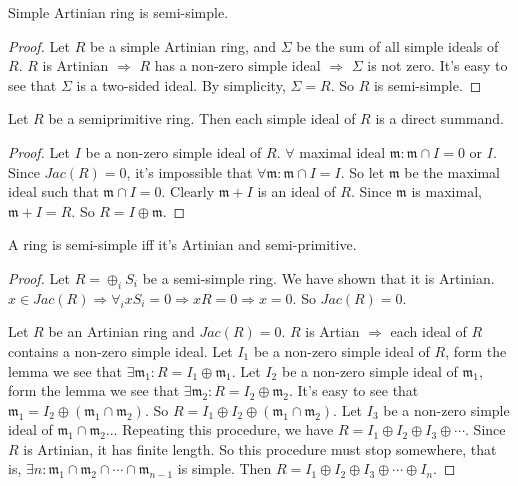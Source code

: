 \documentclass[12pt]{book}
\begin{document}
	\begin{theorem}
		Simple Artinian ring is semi-simple.
	\end{theorem}
	\begin{proof}
		Let $R$ be a simple Artinian ring, and $\Sigma$ be the sum of all simple ideals of $R$.  $R$ is Artinian $\Rightarrow$ $R$ has a non-zero simple ideal $\Rightarrow$ $\Sigma$ is not zero. It's easy to see that $\Sigma$ is a two-sided ideal. By simplicity, $\Sigma=R$. So $R$ is semi-simple.
	\end{proof}
	
	\begin{lemma}
		Let $R$ be a semiprimitive ring. Then each simple ideal of $R$ is a direct summand.
	\end{lemma}
	\begin{proof}
		Let $I$ be a non-zero simple ideal of $R$. $\forall$ maximal ideal $\mathfrak m: \mathfrak m\cap I=0$ or $I$. Since $Jac(R)=0$, it's impossible that $\forall\mathfrak m: \mathfrak m\cap I=I$. So let $\mathfrak m$ be the maximal ideal such that $\mathfrak m\cap I=0$. Clearly $\mathfrak m+ I$ is an ideal of $R$. Since $\mathfrak m$ is maximal, $\mathfrak m+ I=R$. So $R=I\oplus \mathfrak m$.	
	\end{proof}
	
	\begin{theorem}
		A ring is semi-simple iff it's Artinian and semi-primitive.
	\end{theorem}
	\begin{proof}
		Let $R=\oplus_i S_i$ be a semi-simple ring. We have shown that it is Artinian. $x\in Jac(R)\Rightarrow \forall_i xS_i=0\Rightarrow xR=0\Rightarrow x=0$. So $Jac(R)=0$.
		
		Let $R$ be an Artinian ring and $Jac(R)=0$. $R$ is Artian $\Rightarrow$ each ideal of $R$ contains a non-zero simple ideal. Let $I_1$ be a non-zero simple ideal of $R$, form the lemma we see that $\exists \mathfrak m_1: R=I_1\oplus \mathfrak m_1$. Let $I_2$ be a non-zero simple ideal of $\mathfrak m_1$, form the lemma we see that $\exists \mathfrak m_2: R=I_2\oplus \mathfrak m_2$. It's easy to see that $\mathfrak m_1=I_2\oplus (\mathfrak m_1\cap\mathfrak m_2)$. So $R=I_1\oplus I_2\oplus (\mathfrak m_1\cap\mathfrak m_2)$. Let $I_3$ be a non-zero simple ideal of $\mathfrak m_1\cap\mathfrak m_2$... Repeating this procedure, we have $R=I_1\oplus I_2\oplus I_3\oplus\cdots$. Since $R$ is Artinian, it has finite length. So this procedure must stop somewhere, that is, $\exists n:\mathfrak m_1\cap\mathfrak m_2\cap \cdots \cap \mathfrak m_{n-1}$ is simple. Then $R=I_1\oplus I_2\oplus I_3\oplus\cdots \oplus I_n$.
	\end{proof}
	
\end{document}
